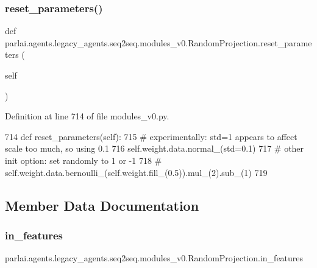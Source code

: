 \subsubsection{\texorpdfstring{reset\+\_\+parameters()}{reset\_parameters()}}
{\footnotesize\ttfamily def parlai.\+agents.\+legacy\+\_\+agents.\+seq2seq.\+modules\+\_\+v0.\+Random\+Projection.\+reset\+\_\+parameters (\begin{DoxyParamCaption}\item[{}]{self }\end{DoxyParamCaption})}



Definition at line 714 of file modules\+\_\+v0.\+py.


\begin{DoxyCode}
714     \textcolor{keyword}{def }reset\_parameters(self):
715         \textcolor{comment}{# experimentally: std=1 appears to affect scale too much, so using 0.1}
716         self.weight.data.normal\_(std=0.1)
717         \textcolor{comment}{# other init option: set randomly to 1 or -1}
718         \textcolor{comment}{# self.weight.data.bernoulli\_(self.weight.fill\_(0.5)).mul\_(2).sub\_(1)}
719 
\end{DoxyCode}


\subsection{Member Data Documentation}
\mbox{\label{classparlai_1_1agents_1_1legacy__agents_1_1seq2seq_1_1modules__v0_1_1RandomProjection_a746c126e0335761df8b17d83b11827c6}} 
\subsubsection{\texorpdfstring{in\+\_\+features}{in\_features}}
{\footnotesize\ttfamily parlai.\+agents.\+legacy\+\_\+agents.\+seq2seq.\+modules\+\_\+v0.\+Random\+Projection.\+in\+\_\+features}




